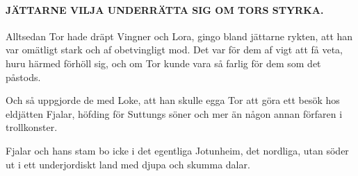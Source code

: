 \paragraph{JÄTTARNE VILJA UNDERRÄTTA SIG OM TORS STYRKA.}

Alltsedan Tor hade dräpt Vingner och Lora, gingo bland jättarne rykten,
att han var omätligt stark och af obetvingligt mod. Det var för dem af
vigt att få veta, huru härmed förhöll sig, och om Tor kunde vara så
farlig för dem som det påstods.

Och så uppgjorde de med Loke, att han skulle egga Tor att göra ett besök
hos eldjätten Fjalar, höfding för Suttungs söner och mer än någon annan
förfaren i trollkonster.

Fjalar och hans stam bo icke i det egentliga Jotunheim, det nordliga,
utan söder ut i ett underjordiskt land med djupa och skumma dalar.


